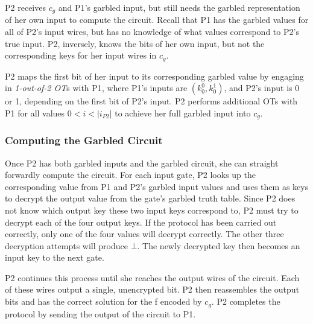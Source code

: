 \ac{P2} receives $c_g$ and \ac{P1}'s garbled input, but still needs the garbled representation of her own input to compute the circuit. Recall that \ac{P1} has the garbled values for all of \ac{P2}'s input wires, but has no knowledge of what values correspond to \ac{P2}'s true input. \ac{P2}, inversely, knows the bits of her own input, but not the corresponding keys for her input wires in $c_g$.

\ac{P2} maps the first bit of her input to its corresponding garbled value by engaging in \emph{1-out-of-2 \ac{OT}}s with \ac{P1}, where \ac{P1}'s inputs are $(k^0_0, k^1_0)$, and \ac{P2}'s input is 0 or 1, depending on the first bit of \ac{P2}'s input.  \ac{P2} performs additional \ac{OT}s with \ac{P1} for all values $0 < i < |i_{P2}|$ to achieve her full garbled input into $c_g$.

\subsubsection{Computing the Garbled Circuit}

Once \ac{P2} has both garbled inputs and the garbled circuit, she can straight forwardly compute the circuit.  For each input gate, \ac{P2} looks up the corresponding value from \ac{P1} and \ac{P2}'s garbled input values and uses them as keys to decrypt the output value from the gate's garbled truth table.  Since \ac{P2} does not know which output key these two input keys correspond to, \ac{P2} must try to decrypt each of the four output keys.  If the protocol has been carried out correctly, only one of the four values will decrypt correctly.  The other three decryption attempts will produce $\bot$. The newly decrypted key then becomes an input key to the next gate.

\ac{P2} continues this process until she reaches the output wires of the circuit.  Each of these wires output a single, unencrypted bit.  \ac{P2} then reassembles the output bits and has the correct solution for the \ac{f} encoded by $c_g$.  \ac{P2} completes the protocol by sending the output of the circuit to \ac{P1}.
